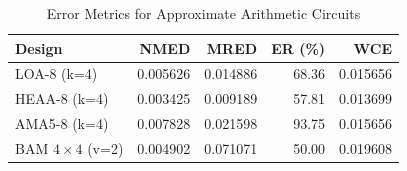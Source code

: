 \begin{table}[t]
\centering
\caption{Error Metrics for Approximate Arithmetic Circuits}
\label{tab:error_metrics}
\begin{tabular}{lrrrr}
\toprule
Design & NMED & MRED & ER (\%) & WCE \\
\midrule
LOA-8 (k=4) & 0.005626 & 0.014886 & 68.36 & 0.015656 \\
HEAA-8 (k=4) & 0.003425 & 0.009189 & 57.81 & 0.013699 \\
AMA5-8 (k=4) & 0.007828 & 0.021598 & 93.75 & 0.015656 \\
BAM $4{\times}4$ (v=2) & 0.004902 & 0.071071 & 50.00 & 0.019608 \\
\bottomrule
\end{tabular}
\end{table}